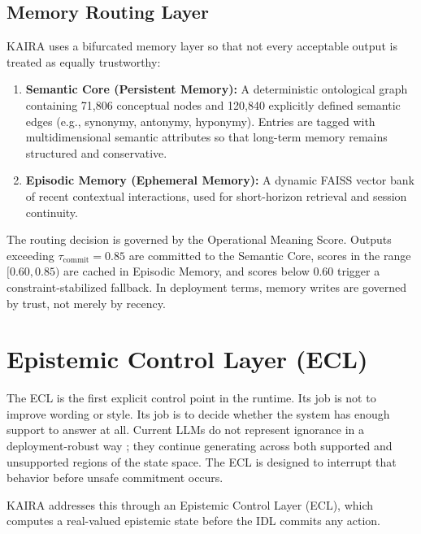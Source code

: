 \documentclass[11pt,a4paper]{article}
\begin{document}
\subsection{Memory Routing Layer}
KAIRA uses a bifurcated memory layer so that not every acceptable output is treated as equally trustworthy:
\begin{enumerate}
  \item \textbf{Semantic Core (Persistent Memory):} A deterministic ontological graph containing 71,806 conceptual nodes and 120,840 explicitly defined semantic edges (e.g., synonymy, antonymy, hyponymy). Entries are tagged with multidimensional semantic attributes so that long-term memory remains structured and conservative.
  \item \textbf{Episodic Memory (Ephemeral Memory):} A dynamic FAISS \cite{johnson2021} vector bank of recent contextual interactions, used for short-horizon retrieval and session continuity.
\end{enumerate}
The routing decision is governed by the Operational Meaning Score. Outputs exceeding $\tau_{\text{commit}} = 0.85$ are committed to the Semantic Core, scores in the range $[0.60, 0.85)$ are cached in Episodic Memory, and scores below $0.60$ trigger a constraint-stabilized fallback. In deployment terms, memory writes are governed by trust, not merely by recency.

\section{Epistemic Control Layer (ECL)}
\label{sec:epistemic}

The ECL is the first explicit control point in the runtime. Its job is not to improve wording or style. Its job is to decide whether the system has enough support to answer at all. Current LLMs do not represent ignorance in a deployment-robust way \cite{kadavath2022}; they continue generating across both supported and unsupported regions of the state space. The ECL is designed to interrupt that behavior before unsafe commitment occurs.

KAIRA addresses this through an Epistemic Control Layer (ECL), which computes a real-valued epistemic state before the IDL commits any action.
\end{document}
